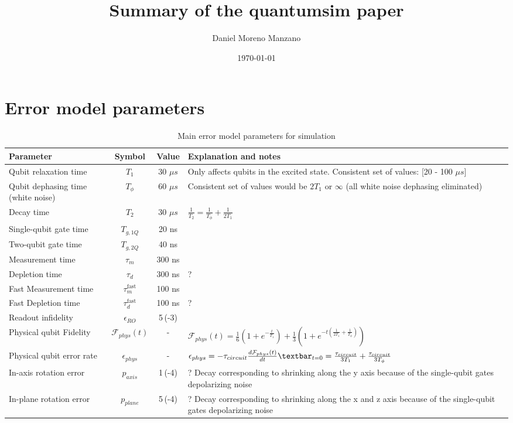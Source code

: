 \documentclass[11pt]{article}
\author{Daniel Moreno Manzano}
\date{\today}
\title{Summary of the quantumsim paper \cite{O_Brien_2017}}
\begin{document}
\maketitle


\section{Error model parameters}
\label{sec:org75efcdd}

\begin{table}[htbp]
\caption{\label{tab:org80aea21}
Main error model parameters for simulation}
\centering
\tiny
\begin{tabular}{lccp{7cm}}
\hline
Parameter & Symbol & Value & Explanation and notes\\
\hline
Qubit relaxation time & \(T_1\) & 30 \(\mu s\) & Only affects qubits in the excited state. Consistent set of values: [20 - 100 \(\mu s\)]\\
Qubit dephasing time (white noise) & \(T_{\phi}\) & 60 \(\mu s\) & Consistent set of values would be \(2 T_1\) or \(\infty\) (all white noise dephasing eliminated)\\
Decay time & \(T_2\) & 30 \(\mu s\) & \(\frac{1}{T_2} = \frac{1}{T_{\phi}} + \frac{1}{2 T_1}\)\\
Single-qubit gate time & \(T_{g,1Q}\) & 20 ns & \\
Two-qubit gate time & \(T_{g,2Q}\) & 40 ns & \\
Measurement time & \(\tau_m\) & 300 ns & \\
Depletion time & \(\tau_d\) & 300 ns & ?\\
Fast Measurement time & \(\tau_m^{\text{fast}}\) & 100 ns & \\
Fast Depletion time & \(\tau_d^{\text{fast}}\) & 100 ns & ?\\
Readout infidelity & \(\epsilon_{RO}\) & 5\,(-3) & \\
Physical qubit Fidelity & \(\mathcal{F}_{phys} (t)\) & - & \(\mathcal{F}_{phys} (t) = \frac{1}{6}\left(1 + e^{-\frac{t}{T_1}}\right) + \frac{1}{3}\left(1 + e^{-t\left(\frac{1}{2 T_1} + \frac{1}{T_{\phi}}\right)} \right)\)\\
Physical qubit error rate & \(\epsilon_{phys}\) & - & \(\epsilon_{phys} = - \tau_{circuit} \frac{d \mathcal{F}_{phys} (t)}{dt} \textbar_{t=0}=\frac{\tau_{circuit}}{3 T_1}+\frac{\tau_{circuit}}{3 T_{\phi}}\)\\
In-axis rotation error & \(p_{axis}\) & 1\,(-4) & ? Decay corresponding to shrinking along the y axis because of the single-qubit gates depolarizing noise\\
In-plane rotation error & \(p_{plane}\) & 5\,(-4) & ? Decay corresponding to shrinking along the x and z axis because of the single-qubit gates depolarizing noise\\
\hline
\end{tabular}
\end{table}
\end{document}
